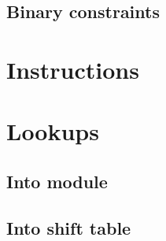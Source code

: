 \subsection{Binary constraints}              \label{rlp utils: constraints: binarities}               

\section{Instructions}                       \label{rlp utils: instructions}                          

\section{Lookups}                            \label{rlp utils: lookups}
\subsection{Into \wcpMod{} module}           \label{rlp utils: lookups: rlp utils into wcp}           
\subsection{Into shift table}                \label{rlp utils: lookups: rlp utils into shf table}     
